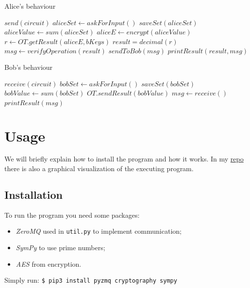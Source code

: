 \documentclass[12pt]{article}
\newcommand{\inlinecode}{\texttt}
\begin{document}
\begin{minipage}{0.46\textwidth}
    \begin{algorithm}[H]
        \centering
        \caption{Alice's behaviour}\label{alice:algo}
        \begin{algorithmic}[1]
            \State $send(circuit)$  
            \State $aliceSet \gets askForInput()$ 
            \State $saveSet(aliceSet)$ 
            \State
            \State $aliceValue \gets sum(aliceSet)$
            \State $aliceE \gets encrypt(aliceValue)$
            \State
            \State $r \gets OT.getResult(aliceE,bKeys)$
            \State
            \State $result = decimal(r)$
            \State $msg \gets verifyOperation(result)$ 
            \State $sendToBob(msg)$
            \State $printResult(result,msg)$

        \end{algorithmic}
    \end{algorithm}
    \end{minipage}
    \hfill
    \begin{minipage}{0.46\textwidth}
    \begin{algorithm}[H]
        \centering
        \caption{Bob's behaviour}\label{bob:algo}
        \begin{algorithmic}[1]
            \State $receive(circuit)$  
            \State $bobSet \gets askForInput()$ 
            \State $saveSet(bobSet)$ 
            \State
            \State $bobValue \gets sum(bobSet)$
            \State
            \State $OT.sendResult(bobValue)$
            \State
            \State $msg \gets receive()$
            \State $printResult(msg)$

        \end{algorithmic}
    \end{algorithm}
    \end{minipage}

\section{Usage}
We will briefly explain how to install the program and how it works. In my \hyperref[zanoGit]{repo} there is also a graphical visualization of the executing program. 
\subsection{Installation}
To run the program you need some packages:
\begin{itemize}
    \item \textit{ZeroMQ} used in \inlinecode{util.py} to implement communication;
    \item \textit{SymPy} to use prime numbers;
    \item \textit{AES} from encryption.
\end{itemize}
Simply run: 
\inlinecode{\$ pip3 install pyzmq cryptography sympy}
\end{document}

